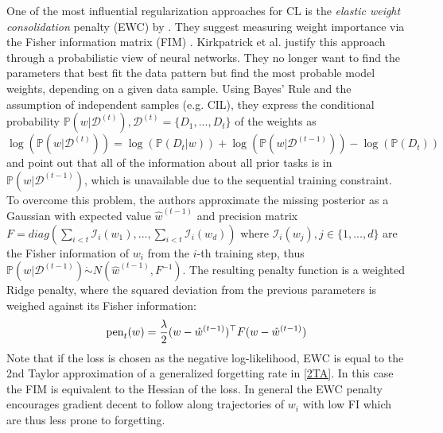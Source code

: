 One of the most influential regularization approaches for CL is the \textit{elastic weight consolidation} penalty (EWC) by \citeauthor{JK} \cite{zhao2024statisticaltheoryregularizationbasedcontinual, zenke2017continuallearningsynapticintelligence, Husz_r_2018, li2024fixeddesignanalysisregularizationbased, titsias2020functionalregularisationcontinuallearning, yin2021optimizationgeneralizationregularizationbasedcontinual, loo2020generalizedvariationalcontinuallearning, benzing2021unifyingregularisationmethodscontinual}. They suggest measuring weight importance via the Fisher information matrix (FIM) \cite{JK}. Kirkpatrick et al. justify this approach through a probabilistic view of neural networks. They no longer want to find the parameters that best fit the data pattern but find the most probable model weights, depending on a given data sample. Using Bayes' Rule and the assumption of independent samples (e.g. CIL), they express the conditional probability $\mathbb{P}(w|\mathcal{D}^{(t)}), \mathcal{D}^{(t)} = \{D_1, ..., D_t\}$ of the weights as
\begin{equation}\label{ewcBayes}
	\log(\mathbb{P}(w|\mathcal{D}^{(t)})) = \log(\mathbb{P}(D_{t}|w)) + \log(\mathbb{P}(w|\mathcal{D}^{(t-1)})) - \log(\mathbb{P}(D_t))
\end{equation}
and point out that all of the information about all prior tasks is in $\mathbb{P}(w|\mathcal{D}^{(t-1)})$, which is unavailable due to the sequential training constraint. To overcome this problem, the authors approximate the missing posterior as a Gaussian with expected value $\hat{w}^{(t-1)}$ and precision matrix $F = diag(\sum_{i < t}\mathcal{I}_i(w_1), ..., \sum_{i < t }\mathcal{I}_i(w_d))$ where $\mathcal{I}_i(w_j), j \in \{1, ..., d\}$ are the Fisher information of $w_i$ from the $i$-th training step, thus $\mathbb{P}(w|\mathcal{D}^{(t-1)}) \dot{\sim} N(\hat{w}^{(t-1)}, F^{-1})$. The resulting penalty function is a weighted Ridge penalty, where the squared deviation from the previous parameters is weighed against its Fisher information:
\begin{equation}\label{EWC}
	\operatorname{pen}_t(w) = \frac{\lambda}{2}(w - \hat{w}^{(t-1)})^\top F (w - \hat{w}^{(t-1)})
\end{equation}
Note that if the loss is chosen as the negative log-likelihood, EWC is equal to the 2nd Taylor approximation of a generalized forgetting rate in \eqref{2TA}. In this case the FIM is equivalent to the Hessian of the loss. In general the EWC penalty encourages gradient decent to follow along trajectories of $w_i$ with low FI which are thus less prone to forgetting.\\
